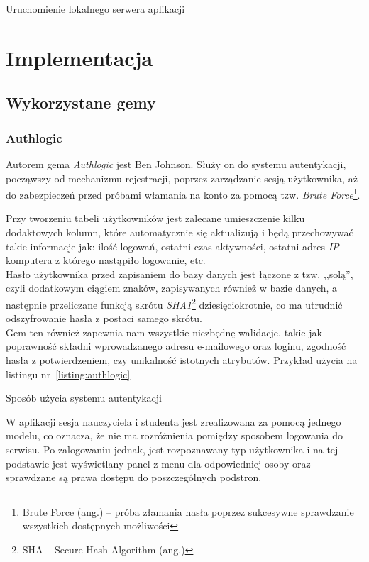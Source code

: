 \documentclass[a4paper,12pt]{article}
\begin{document}
\begin{listing}
  
  \caption{Uruchomienie lokalnego serwera aplikacji}
  \label{listing:ubuntu_start_server}
\end{listing}

\clearpage
\section{Implementacja}

\subsection{Wykorzystane gemy}
\subsubsection{Authlogic}
Autorem gema \emph{Authlogic} jest Ben Johnson. Służy on do systemu autentykacji,
począwszy od mechanizmu rejestracji, poprzez zarządzanie sesją użytkownika, aż do
zabezpieczeń przed próbami włamania na konto za pomocą tzw. \emph{Brute
Force}\footnote{Brute Force (ang.) -- próba złamania hasła poprzez sukcesywne sprawdzanie
wszystkich dostępnych możliwości}.


Przy tworzeniu tabeli użytkowników jest zalecane umieszczenie kilku dodaktowych kolumn,
które automatycznie się aktualizują i będą przechowywać takie informacje jak: ilość
logowań, ostatni czas aktywności, ostatni adres \emph{IP} komputera z którego nastąpiło
logowanie, etc.\\
Hasło użytkownika przed zapisaniem do bazy danych jest łączone z tzw. ,,solą'', czyli
dodatkowym ciągiem znaków, zapisywanych również w bazie danych, a następnie przeliczane
funkcją skrótu \emph{SHA1}\footnote{SHA -- Secure Hash Algorithm (ang.)}
dziesięciokrotnie, co ma utrudnić odszyfrowanie hasła z postaci samego skrótu.\\
Gem ten również zapewnia nam wszystkie niezbędnę walidacje, takie jak poprawność składni
wprowadzanego adresu e-mailowego oraz loginu, zgodność hasła z potwierdzeniem, czy
unikalność istotnych atrybutów. Przykład użycia na listingu nr~\ref{listing:authlogic}

\begin{listing}
  
  \caption{Sposób użycia systemu autentykacji}
  \label{listing:authlogic}
\end{listing}


W aplikacji sesja nauczyciela i studenta jest zrealizowana za pomocą jednego modelu, co
oznacza, że nie ma rozróżnienia pomiędzy sposobem logowania do serwisu. Po zalogowaniu
jednak, jest rozpoznawany typ użytkownika i na tej podstawie jest wyświetlany panel z menu
dla odpowiedniej osoby oraz sprawdzane są prawa dostępu do poszczególnych podstron.
\end{document}
